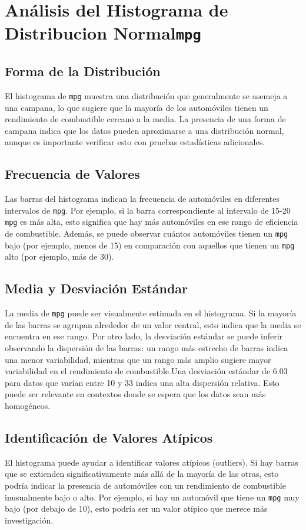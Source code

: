 \documentclass{article}
\begin{document}
\section{Análisis del Histograma de Distribucion Normal\texttt{mpg} }

\subsection{Forma de la Distribución}
El histograma de \texttt{mpg} muestra una distribución que generalmente se asemeja a una campana, lo que sugiere que la mayoría de los automóviles tienen un rendimiento de combustible cercano a la media. La presencia de una forma de campana indica que los datos pueden aproximarse a una distribución normal, aunque es importante verificar esto con pruebas estadísticas adicionales.

\subsection{Frecuencia de Valores}
Las barras del histograma indican la frecuencia de automóviles en diferentes intervalos de \texttt{mpg}. Por ejemplo, si la barra correspondiente al intervalo de 15-20 \texttt{mpg} es más alta, esto significa que hay más automóviles en ese rango de eficiencia de combustible. Además, se puede observar cuántos automóviles tienen un \texttt{mpg} bajo (por ejemplo, menos de 15) en comparación con aquellos que tienen un \texttt{mpg} alto (por ejemplo, más de 30).

\subsection{Media y Desviación Estándar}
La media de \texttt{mpg} puede ser visualmente estimada en el histograma. Si la mayoría de las barras se agrupan alrededor de un valor central, esto indica que la media se encuentra en ese rango. Por otro lado, la desviación estándar se puede inferir observando la dispersión de las barras: un rango más estrecho de barras indica una menor variabilidad, mientras que un rango más amplio sugiere mayor variabilidad en el rendimiento de combustible.Una desviación estándar de 6.03 para datos que varían entre 10 y 33 indica una alta dispersión relativa. Esto puede ser relevante en contextos donde se espera que los datos sean más homogéneos.

\subsection{Identificación de Valores Atípicos}
El histograma puede ayudar a identificar valores atípicos (outliers). Si hay barras que se extienden significativamente más allá de la mayoría de las otras, esto podría indicar la presencia de automóviles con un rendimiento de combustible inusualmente bajo o alto. Por ejemplo, si hay un automóvil que tiene un \texttt{mpg} muy bajo (por debajo de 10), esto podría ser un valor atípico que merece más investigación.
\end{document}
